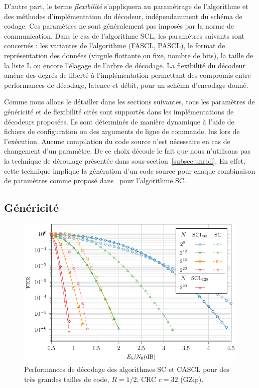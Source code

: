 D'autre part, le terme \textit{flexibilité} s'appliquera au paramétrage de l'algorithme et des méthodes d'implémentation du décodeur, indépendamment du schéma de codage. Ces paramètres ne sont généralement pas imposés par la norme de communication. Dans le cas de l'algorithme SCL, les paramètres suivants sont concernés : les variantes de l'algorithme (FASCL, PASCL), le format de représentation des données (virgule flottante ou fixe, nombre de bits), la taille de la liste $\mathrm{L}$ ou encore l'élagage de l'arbre de décodage. La flexibilité du décodeur amène des degrés de liberté à l'implémentation permettant des compromis entre performances de décodage, latence et débit, pour un schéma d'encodage donné.

Comme nous allons le détailler dans les sections suivantes, tous les paramètres de généricité et de flexibilité cités sont supportés dans les implémentations de décodeurs proposées. Ils sont déterminés de manière dynamique à l'aide de fichiers de configuration ou des arguments de ligne de commande, lus lors de l'exécution. Aucune compilation du code source n'est nécessaire en cas de changement d'un paramètre. De ce choix découle le fait que nous n'utilisons pas la technique de déroulage présentée dans sous-section~\ref{subsec:unroll}. En effet, cette technique implique la génération d'un code source pour chaque combinaison de paramètres comme proposé dans~\cite{sarkis_autogenerating_2014} pour l'algorithme SC.

\subsection{Généricité}

\begin{figure}[t]
\includegraphics[width=\textwidth]{main/ch2_fig/curves/code/tikz/code}
\caption{Performances de décodage des algorithmes SC et CASCL pour des très grandes tailles de code, $R=1/2$, CRC $c=32$ (GZip).}
\label{fig:large_scl}
\end{figure}

